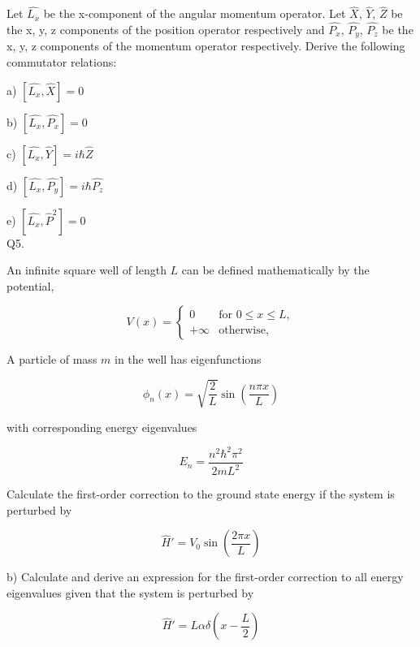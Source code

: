 \documentclass[a4paper,11pt]{article}
\begin{document}
\noindent Let \( \hat{L_{x}} \) be the x-component of the angular momentum operator. Let \( \hat{X} \), \( \hat{Y} \), \( \hat{Z} \) be the x, y, z components of the position operator respectively and \( \hat{P_{x}} \), \( \hat{P_{y}} \), \( \hat{P_{z}} \)  be the x, y, z components of the momentum operator respectively. Derive the following commutator relations:

\medskip

\noindent a) \( \left[ \hat{L_{x}}, \hat{X} \right] = 0 \)

\medskip

\noindent b) \( \left[ \hat{L_{x}}, \hat{P_{x}} \right] = 0 \)

\medskip

\noindent c) \( \left[ \hat{L_{x}}, \hat{Y} \right] = i \hbar \hat{Z} \)

\medskip

\noindent d) \( \left[ \hat{L_{x}}, \hat{P_{y}} \right] = i \hbar \hat{P_{z}} \)

\medskip

\noindent e) \( \left[ \hat{L_{x}}, \hat{P}^{2} \right] = 0 \) \\

\noindent Q5. 

\noindent An infinite square well of length \( L \) can be defined mathematically by the potential,

\[ V(x) = \begin{cases}
0 & \text{for } 0 \leq x \leq L,\\
+\infty  & \text{otherwise,} 
\end{cases} \]

\noindent A particle of mass \( m \) in the well has eigenfunctions

\[ \phi_{n}(x) = \sqrt{\frac{2}{L}} \sin\left(\frac{n \pi x}{L} \right) \]

\noindent with corresponding energy eigenvalues 

\[ E_{n} = \frac{n^{2}\hbar^{2}\pi^{2}}{2mL^{2}} \]

\noindent Calculate the first-order correction to the ground state energy if the system is perturbed by 

\[ \hat{H}' = V_{0} \sin\left(\frac{2 \pi x}{L} \right) \]

\medskip

\noindent b) Calculate and derive an expression for the first-order correction to all energy eigenvalues given that the system is perturbed by 

\[ \hat{H}' = L\alpha \delta\left(x - \frac{L}{2} \right) \]
\end{document}
